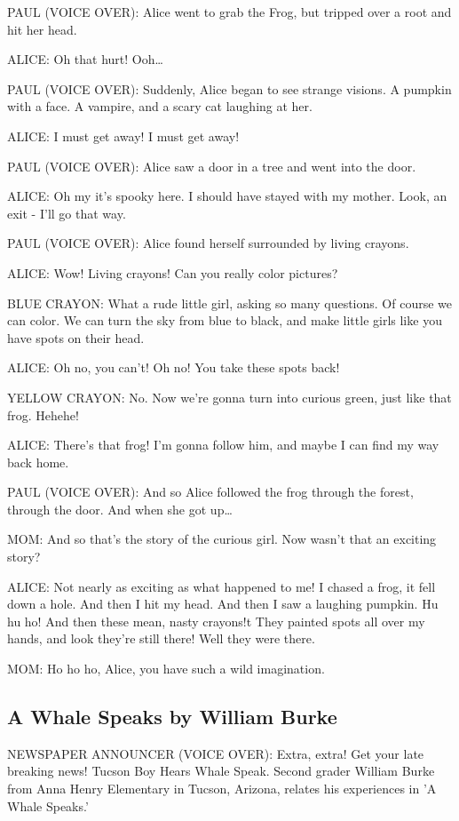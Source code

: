 PAUL (VOICE OVER):
Alice went to grab the Frog, but tripped over a root and hit her head.

ALICE:
Oh that hurt!
Ooh\dots

PAUL (VOICE OVER):
Suddenly, Alice began to see strange visions.
A pumpkin with a face.
A vampire, and a scary cat laughing at her.

ALICE:
I must get away!
I must get away!

PAUL (VOICE OVER):
Alice saw a door in a tree and went into the door.

ALICE:
Oh my it's spooky here.
I should have stayed with my mother.
Look, an exit - I'll go that way.

PAUL (VOICE OVER):
Alice found herself surrounded by living crayons.

ALICE:
Wow!
Living crayons!
Can you really color pictures?

BLUE CRAYON:
What a rude little girl, asking so many questions.
Of course we can color.
We can turn the sky from blue to black, and make little girls like you have spots on their head.

ALICE:
Oh no, you can't!
Oh no!
You take these spots back!

YELLOW CRAYON:
No.
Now we're gonna turn into curious green, just like that frog.
Hehehe!

ALICE:
There's that frog!
I'm gonna follow him, and maybe I can find my way back home.

PAUL (VOICE OVER):
And so Alice followed the frog through the forest, through the door.
And when she got up\dots

MOM:
And so that's the story of the curious girl.
Now wasn't that an exciting story?

ALICE:
Not nearly as exciting as what happened to me!
I chased a frog, it fell down a hole.
And then I hit my head.
And then I saw a laughing pumpkin.
Hu hu ho!
And then these mean, nasty crayons!t
They painted spots all over my hands, and look they're still there!
Well they were there.

MOM:
Ho ho ho, Alice, you have such a wild imagination.

\subsection{A Whale Speaks by William Burke}

NEWSPAPER ANNOUNCER (VOICE OVER):
Extra, extra!
Get your late breaking news!
Tucson Boy Hears Whale Speak.
Second grader William Burke from Anna Henry Elementary in Tucson, Arizona, relates his experiences in 'A Whale Speaks.'

